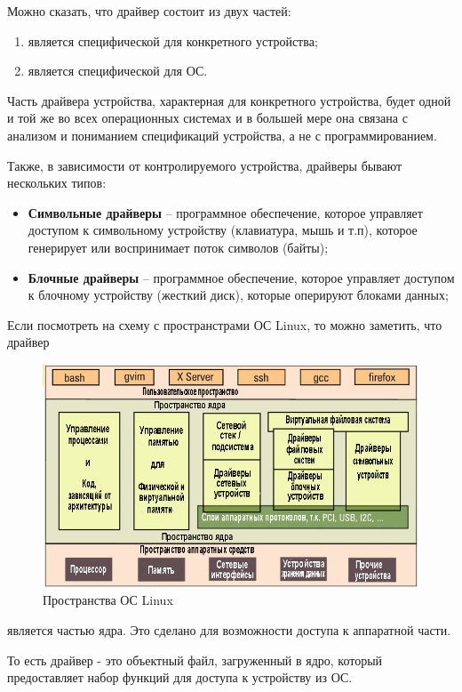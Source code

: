 Можно сказать, что драйвер состоит из двух частей:
\begin{enumerate}
\item является специфической для конкретного устройства;
\item является специфической для ОС.
\end{enumerate}
Часть драйвера устройства, характерная для конкретного устройства, будет одной и той же во всех операционных системах и в большей мере она связана с анализом и пониманием спецификаций устройства, а не с программированием. 

Также, в зависимости от контролируемого устройства, драйверы бывают нескольких типов:
\begin{itemize}
\item \textbf{Символьные драйверы} – программное обеспечение, которое управляет доступом к символьному устройству (клавиатура, мышь и т.п), которое генерирует или воспринимает поток символов (байты);
\item \textbf{Блочные драйверы} – программное обеспечение, которое управляет доступом к блочному устройству (жесткий диск), которые оперируют блоками данных;
\end{itemize}

Если посмотреть на схему с пространстрами ОС Linux, то можно заметить, что драйвер
\begin{figure}[H]
  \centering
  \includegraphics[width=\textwidth]{img/linux_arch}
  \caption{Пространства ОС Linux}
\end{figure}
является частью ядра. Это сделано для возможности доступа к аппаратной части.

То есть драйвер - это объектный файл, загруженный в ядро, который предоставляет набор функций для доступа к устройству из ОС. 

